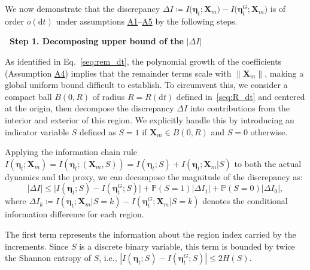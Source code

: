 We now demonstrate that the discrepancy $\Delta I\coloneq I\big(\bm\eta_t;\bm X_m) - I\big(\bm\eta_t^G;\bm X_m)$ is of order $o(\mathrm dt)$ under assumptions \hyperlink{assumption:A1}{A1}--\hyperlink{assumption:A5}{A5} by the following steps.

\bigskip
\noindent\textbf{\textbullet\ Step 1. Decomposing upper bound of the} $|\Delta I|$

As identified in Eq.~\eqref{seq:rem_dt}, the polynomial growth of the coefficients (Assumption \hyperlink{assumption:A4}{A4}) implies that the remainder terms scale with $\|\bm X_m\|$, making a global uniform bound difficult to establish. 
To circumvent this, we consider a compact ball $B(0, R)$ of radius $R=R(\mathrm dt)$ defined in~\eqref{seq:R_dt} and centered at the origin, then decompose the discrepancy $\Delta I$ into contributions from the interior and exterior of this region. We explicitly handle this by introducing an indicator variable $S$ defined as $S=1$ if $\bm X_m \in B(0, R)$ and $S=0$ otherwise.

Applying the information chain rule $I(\bm \eta_t; \bm X_m) = I(\bm \eta_t; (\bm X_m,S)) = I(\bm \eta_t; S) + I(\bm \eta_t; \bm X_m | S)$ to both the actual dynamics and the proxy, we can decompose the magnitude of the discrepancy as:
\begin{equation}
    |\Delta I| \le 
    \big| I(\bm \eta_t; S) - I(\bm \eta_t^G; S) \big| 
    + \mathbb P(S=1)|\Delta I_1| + \mathbb P(S=0)|\Delta I_0|,
    \label{seq:deltaI_first_decom}
\end{equation}
where $\Delta I_k \coloneq I(\bm \eta_t; \bm X_m | S=k) - I(\bm \eta_t^G; \bm X_m | S=k)$ denotes the conditional information difference for each region.

The first term represents the information about the region index carried by the increments. Since $S$ is a discrete binary variable, this term is bounded by twice the Shannon entropy of $S$, i.e., $|I(\bm \eta_t; S) - I(\bm \eta_t^G; S)| \le 2H(S)$.

